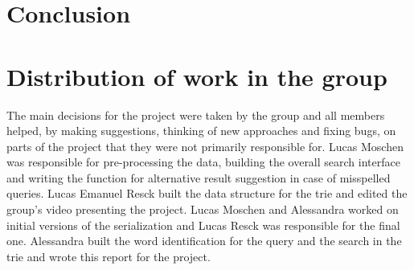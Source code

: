 \documentclass{article}
\begin{document}
\section*{Conclusion}

\section*{Distribution of work in the group}
The main decisions for the project were taken by the group and all members helped, by making suggestions, thinking of new approaches and fixing bugs, on parts of the project that they were not primarily responsible for. Lucas Moschen was responsible for pre-processing the data, building the overall search interface and writing the function for alternative result suggestion in case of misspelled queries. Lucas Emanuel Resck built the data structure for the trie and edited the group's video presenting the project. Lucas Moschen and Alessandra worked on initial versions of the serialization and Lucas Resck was responsible for the final one. Alessandra built the word identification for the query and the search in the trie and wrote this report for the project. 

\end{document}
